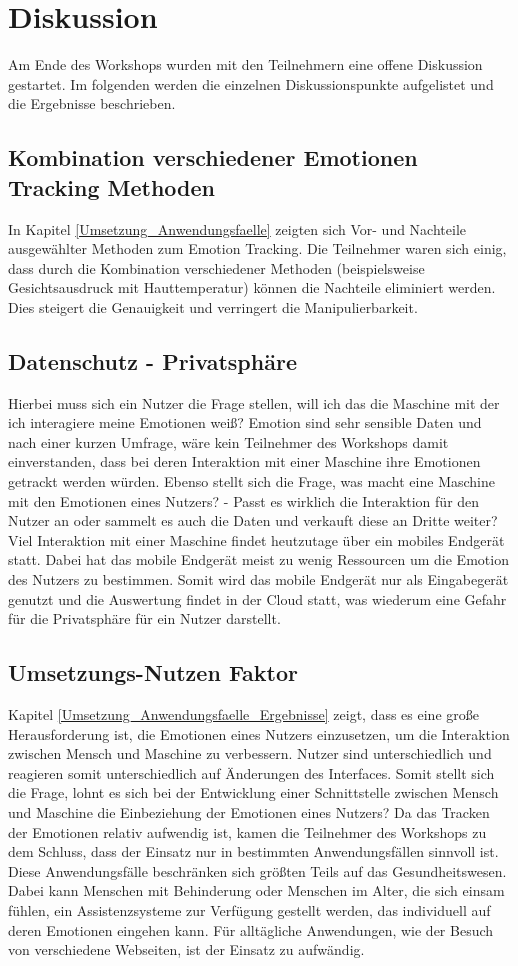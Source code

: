 \section{Diskussion}
Am Ende des Workshops wurden mit den Teilnehmern eine offene Diskussion gestartet. Im folgenden werden die einzelnen Diskussionspunkte aufgelistet und die Ergebnisse beschrieben.

\subsection{Kombination verschiedener Emotionen Tracking Methoden}
In Kapitel \ref{Umsetzung_Anwendungsfaelle} zeigten sich Vor- und Nachteile ausgewählter Methoden zum Emotion Tracking. Die Teilnehmer waren sich einig, dass durch die Kombination verschiedener Methoden (beispielsweise Gesichtsausdruck mit Hauttemperatur) können die Nachteile eliminiert werden. Dies steigert die Genauigkeit und verringert die Manipulierbarkeit.

\subsection{Datenschutz - Privatsphäre}
Hierbei muss sich ein Nutzer die Frage stellen, will ich das die Maschine mit der ich interagiere meine Emotionen weiß? Emotion sind sehr sensible Daten und nach einer kurzen Umfrage, wäre kein Teilnehmer des Workshops damit einverstanden, dass bei deren Interaktion mit einer Maschine ihre Emotionen getrackt werden würden. Ebenso stellt sich die Frage, was macht eine Maschine mit den Emotionen eines Nutzers? - Passt es wirklich die Interaktion für den Nutzer an oder sammelt es auch die Daten und verkauft diese an Dritte weiter? Viel Interaktion mit einer Maschine findet heutzutage über ein mobiles Endgerät statt. Dabei hat das mobile Endgerät meist zu wenig Ressourcen um die Emotion des Nutzers zu bestimmen. Somit wird das mobile Endgerät nur als Eingabegerät genutzt und die Auswertung findet in der Cloud statt, was wiederum eine Gefahr für die Privatsphäre für ein Nutzer darstellt.

\subsection{Umsetzungs-Nutzen Faktor}
Kapitel \ref{Umsetzung_Anwendungsfaelle_Ergebnisse} zeigt, dass es eine große Herausforderung ist, die Emotionen eines Nutzers einzusetzen, um die Interaktion zwischen Mensch und Maschine zu verbessern. Nutzer sind unterschiedlich und reagieren somit unterschiedlich auf Änderungen des Interfaces. Somit stellt sich die Frage, lohnt es sich bei der Entwicklung einer Schnittstelle zwischen Mensch und Maschine die Einbeziehung der Emotionen eines Nutzers? Da das Tracken der Emotionen relativ aufwendig ist, kamen die Teilnehmer des Workshops zu dem Schluss, dass der Einsatz nur in bestimmten Anwendungsfällen sinnvoll ist. Diese Anwendungsfälle beschränken sich größten Teils auf das Gesundheitswesen. Dabei kann Menschen mit Behinderung oder Menschen im Alter, die sich einsam fühlen, ein Assistenzsysteme zur Verfügung gestellt werden, das individuell auf deren Emotionen eingehen kann. Für alltägliche Anwendungen, wie der Besuch von verschiedene Webseiten, ist der Einsatz zu aufwändig.